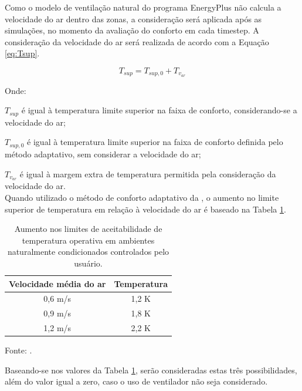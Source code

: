 \documentclass[brazil,hardcopy,openany,a5paper]{ufscthesis}
\begin{document}
		Como o modelo de ventilação natural do programa EnergyPlus não calcula a velocidade do ar dentro das zonas, a consideração será aplicada após as simulações, no momento da avaliação do conforto em cada timestep. A consideração da velocidade do ar será realizada de acordo com a Equação \ref{eq:Tsup}.
		
		\begin{equation}
		\label{eq:Tsup}
		T_{sup} = T_{sup,0} + T_{v_{ar}}
		\end{equation}
		
		Onde:
		
		$T_{sup}$ é igual à temperatura limite superior na faixa de conforto, considerando-se a velocidade do ar;
		
		$T_{sup,0}$ é igual à temperatura limite superior na faixa de conforto definida pelo método adaptativo, sem considerar a velocidade do ar;
		
		$T_{v_{ar}}$ é igual à margem extra de temperatura permitida pela consideração da velocidade do ar.
		\\
		
		Quando utilizado o método de conforto adaptativo da  \cite{ASHRAEStandard552017}, o aumento no limite superior de temperatura em relação à velocidade do ar é baseado na Tabela \ref{table:var}.		
		
		\begin{table}[h]
			\centering
			\caption{Aumento nos limites de aceitabilidade de temperatura operativa em ambientes naturalmente condicionados controlados pelo usuário.}
			\label{table:var}
			\begin{tabular}{|c |c |}
				\hline
				\textbf{Velocidade média do ar} & \textbf{Temperatura} \\
				\hline
				0,6 m/s & 1,2 K \\
				\hline
				0,9 m/s & 1,8 K \\
				\hline
				1,2 m/s & 2,2 K \\
				\hline 
			\end{tabular}
			\begin{flushleft}
			Fonte:   \cite{ASHRAEStandard552017}.
			\end{flushleft}				
		\end{table}
	
		Baseando-se nos valores da Tabela \ref{table:var}, serão consideradas estas três possibilidades, além do valor igual a zero, caso o uso de ventilador não seja considerado.
		
\end{document}
